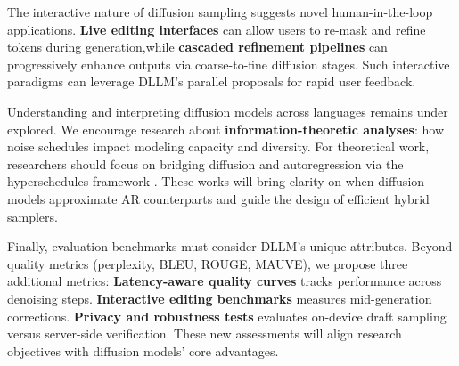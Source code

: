 The interactive nature of diffusion sampling suggests novel human-in-the-loop applications. \textbf{Live editing interfaces} can allow users to re-mask and refine tokens during generation,while \textbf{cascaded refinement pipelines} can progressively enhance outputs via coarse-to-fine diffusion stages. Such interactive paradigms can leverage DLLM’s parallel proposals for rapid user feedback.



Understanding and interpreting diffusion models across languages remains under explored. We encourage research about  \textbf{information-theoretic analyses}: how noise schedules impact modeling capacity and diversity. For theoretical work, researchers should focus on bridging diffusion and autoregression via the hyperschedules framework \cite{fathi_unifying_2025}. These works will bring clarity on when diffusion models approximate AR counterparts and guide the design of efficient hybrid samplers.



Finally, evaluation benchmarks must consider DLLM’s unique attributes. Beyond quality metrics (perplexity, BLEU, ROUGE, MAUVE), we propose three additional metrics: \textbf{Latency-aware quality curves} tracks performance across denoising steps. \textbf{Interactive editing benchmarks} measures mid-generation corrections. \textbf{Privacy and robustness tests} evaluates on-device draft sampling versus server-side verification. These new assessments will align research objectives with diffusion models' core advantages.

